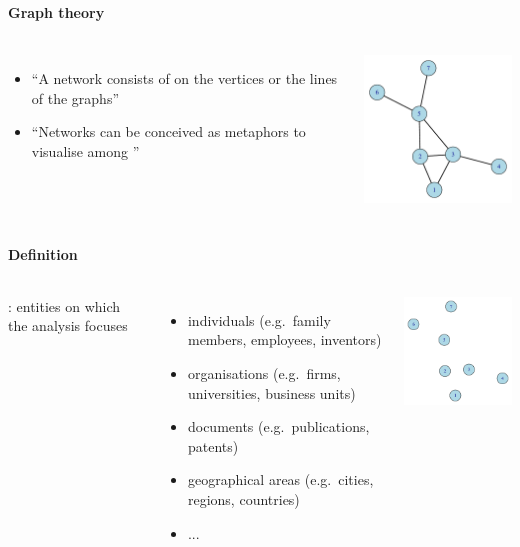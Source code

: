\documentclass[8pt]{beamer}
\begin{document}
\begin{frame}
\frametitle{\insertsection}
\framesubtitle{Graph theory}

\begin{columns}[c]
	\begin{itemize}
		\item ``A network consists of {\color{blue}{a graph and additional information}} on the vertices or the lines of the graphs'' \cite{deNooy2005}
		\item ``Networks can be conceived as metaphors to visualise {\color{blue}{a (finite) set of edges (links, ties)}} among {\color{blue}{a (finite) set of nodes (vertices)}}'' \cite{Wassermann1994}
	\end{itemize}

\centering
\includegraphics[width=5cm]{base}\\
\end{columns}

\end{frame}


\begin{frame}
\frametitle{\insertsection}
\framesubtitle{Definition}

\begin{columns}[c]
{\color{blue}{Nodes}}: entities on which the analysis focuses
	\begin{itemize}
    \item individuals (e.g.\ family members, employees, inventors)
    \item organisations (e.g.\ firms, universities, business units)
    \item documents (e.g.\ publications, patents)
    \item geographical areas (e.g.\ cities, regions, countries)
    \item ...
    \end{itemize}

\centering
\includegraphics[width=5cm]{nodes}
\end{columns}

\end{frame}
\end{document}
